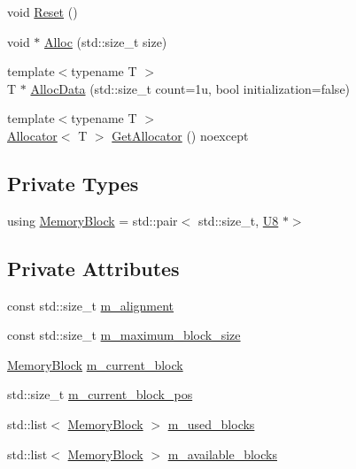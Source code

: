 \begin{DoxyCompactItemize}
void \mbox{\hyperlink{classmage_1_1_memory_arena_a117b74c7bd5dfb28dfdaae6cab253491}{Reset}} ()
\item 
void $\ast$ \mbox{\hyperlink{classmage_1_1_memory_arena_a6752498413d81158f8360f6d6e909b39}{Alloc}} (std\+::size\+\_\+t size)
\item 
{\footnotesize template$<$typename T $>$ }\\T $\ast$ \mbox{\hyperlink{classmage_1_1_memory_arena_a2236b6b1b4998eab780cc0bc398efcfa}{Alloc\+Data}} (std\+::size\+\_\+t count=1u, bool initialization=false)
\item 
{\footnotesize template$<$typename T $>$ }\\\mbox{\hyperlink{classmage_1_1_memory_arena_1_1_allocator}{Allocator}}$<$ T $>$ \mbox{\hyperlink{classmage_1_1_memory_arena_a20e4f7201a46f09a4f964a7214aa91cc}{Get\+Allocator}} () noexcept
\end{DoxyCompactItemize}
\subsection*{Private Types}
\begin{DoxyCompactItemize}
\item 
using \mbox{\hyperlink{classmage_1_1_memory_arena_a2886806e0e4cba357eba84b4b2e729ab}{Memory\+Block}} = std\+::pair$<$ std\+::size\+\_\+t, \mbox{\hyperlink{namespacemage_a30677c03d683c4c35630c25f6ff3fb7f}{U8}} $\ast$$>$
\end{DoxyCompactItemize}
\subsection*{Private Attributes}
\begin{DoxyCompactItemize}
\item 
const std\+::size\+\_\+t \mbox{\hyperlink{classmage_1_1_memory_arena_ab42f6897441fbf402c55a6353c7424c2}{m\+\_\+alignment}}
\item 
const std\+::size\+\_\+t \mbox{\hyperlink{classmage_1_1_memory_arena_a81218de0b691498788d123797ba93c98}{m\+\_\+maximum\+\_\+block\+\_\+size}}
\item 
\mbox{\hyperlink{classmage_1_1_memory_arena_a2886806e0e4cba357eba84b4b2e729ab}{Memory\+Block}} \mbox{\hyperlink{classmage_1_1_memory_arena_a2680b25146c174ac7fd639f1bd0acc7c}{m\+\_\+current\+\_\+block}}
\item 
std\+::size\+\_\+t \mbox{\hyperlink{classmage_1_1_memory_arena_afd9b40633d2ff32e64f90bda68f5114f}{m\+\_\+current\+\_\+block\+\_\+pos}}
\item 
std\+::list$<$ \mbox{\hyperlink{classmage_1_1_memory_arena_a2886806e0e4cba357eba84b4b2e729ab}{Memory\+Block}} $>$ \mbox{\hyperlink{classmage_1_1_memory_arena_a49a6d7fb9396f57210897abfb4e30903}{m\+\_\+used\+\_\+blocks}}
\item 
std\+::list$<$ \mbox{\hyperlink{classmage_1_1_memory_arena_a2886806e0e4cba357eba84b4b2e729ab}{Memory\+Block}} $>$ \mbox{\hyperlink{classmage_1_1_memory_arena_a02f251a5aafa61d239b4daed3458a654}{m\+\_\+available\+\_\+blocks}}
\end{DoxyCompactItemize}


